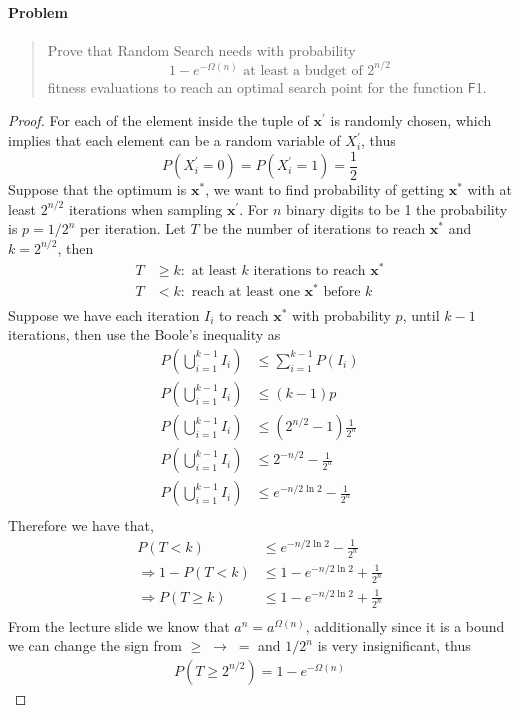 \documentclass[a4paper, 12pt]{article}
\begin{document}
\paragraph{Problem}
    \begin{quote}
        Prove that Random Search needs with probability
        \[
            1 - e^{-\Omega(n)} 
            \text{ at least a budget of } 
            2^{n/2} 
        \]
        fitness evaluations to reach an optimal search point for the function $\mathsf{F}$1.
    \end{quote}
\begin{proof}
    For each of the element inside the tuple of $\mathbf{x}^\prime$ is randomly chosen, which implies that each element can be a random variable of
    $X^\prime_i$, thus
    \begin{equation*}
        P(X^\prime_i = 0) = P(X^\prime_i = 1) = \frac{1}{2} 
    \end{equation*}
    Suppose that the optimum is $\mathbf{x}^*$, we want to find probability of getting $\mathbf{x}^*$ with at least $2^{n/2}$ iterations when sampling 
    $\mathbf{x}^\prime$. For $n$ binary digits to be 1 the probability is $p = 1/2^n$ per iteration. Let $T$ be the number of iterations to reach $\mathbf{x}^*$
    and $k = 2^{n/2}$, then
    \begin{align*}
        T &\geq k:\text{ at least $k$ iterations to reach $\mathbf{x}^*$}\\
        T &< k: \text{ reach at least one $\mathbf{x}^*$ before $k$}\\
    \end{align*}
    Suppose we have each iteration $I_i$ to reach $\mathbf{x}^*$ with probability $p$, until $k-1$ iterations, then use the Boole's inequality as
    \begin{align*}
        P\left(\bigcup^{k-1}_{i=1}I_i\right) &\leq \sum_{i = 1}^{k-1}P(I_i)\\
        P\left(\bigcup^{k-1}_{i=1}I_i\right) &\leq (k-1)p\\
        P\left(\bigcup^{k-1}_{i=1}I_i\right) &\leq \left(2^{n/2} - 1\right)\frac{1}{2^n}\\
        P\left(\bigcup^{k-1}_{i=1}I_i\right) &\leq 2^{-n/2} - \frac{1}{2^n}\\
        P\left(\bigcup^{k-1}_{i=1}I_i\right) &\leq e^{-n/2\ln2}- \frac{1}{2^n}\\
    \end{align*}
    Therefore we have that,
    \begin{align*}
        P(T < k) &\leq e^{-n/2\ln2}- \frac{1}{2^n}\\
        \Rightarrow 1 - P(T < k) &\leq 1 - e^{-n/2\ln2} + \frac{1}{2^n}\\
        \Rightarrow P(T \geq k) &\leq 1 - e^{-n/2\ln2} + \frac{1}{2^n}\\
    \end{align*}
    From the lecture slide we know that $a^n = a^{\Omega(n)}$, additionally since it is a bound we can change the sign from $\geq\;\rightarrow\;=$
    and $1/2^n$ is very insignificant, thus
    \begin{align*}
        P(T \geq 2^{n/2}) = 1 - e^{-\Omega(n)}
    \end{align*}
\end{proof}
\end{document}
